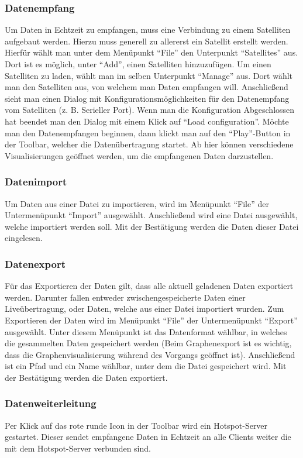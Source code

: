 \subsubsection{Datenempfang}
Um Daten in Echtzeit zu empfangen, muss eine Verbindung zu einem Satelliten aufgebaut werden. Hierzu muss generell zu allererst ein Satellit erstellt werden. Hierfür wählt man unter dem Menüpunkt ``File'' den Unterpunkt ``Satellites'' aus. Dort ist es möglich, unter ``Add'', einen Satelliten hinzuzufügen. Um einen Satelliten zu laden, wählt man im selben Unterpunkt ``Manage'' aus. Dort wählt man den Satelliten aus, von welchem man Daten empfangen will. Anschließend sieht man einen Dialog mit Konfigurationsmöglichkeiten für den Datenempfang vom Satelliten (z. B. Serieller Port). Wenn man die Konfiguration Abgeschlossen hat beendet man den Dialog mit einem Klick auf ``Load configuration''. 
Möchte man den Datenempfangen beginnen, dann klickt man auf den ``Play''-Button in der Toolbar, welcher die Datenübertragung startet. Ab hier können verschiedene Visualisierungen geöffnet werden, um die empfangenen Daten darzustellen.
\subsubsection{Datenimport}
Um Daten aus einer Datei zu importieren, wird im Menüpunkt ``File'' der Untermenüpunkt ``Import'' ausgewählt. Anschließend wird eine Datei ausgewählt, welche importiert werden soll. Mit der Bestätigung werden die Daten dieser Datei eingelesen.
\subsubsection{Datenexport}
Für das Exportieren der Daten gilt, dass alle aktuell geladenen Daten exportiert werden. Darunter fallen entweder zwischengespeicherte Daten einer Liveübertragung, oder Daten, welche aus einer Datei importiert wurden.
Zum Exportieren der Daten wird im Menüpunkt ``File'' der Untermenüpunkt ``Export'' ausgewählt. Unter diesem Menüpunkt ist das Datenformat wählbar, in welches die gesammelten Daten gespeichert werden (Beim Graphenexport ist es wichtig, dass die Graphenvisualisierung während des Vorgangs geöffnet ist). Anschließend ist ein Pfad und ein Name wählbar, unter dem die Datei gespeichert wird. Mit der Bestätigung werden die Daten exportiert.
\subsubsection{Datenweiterleitung}
Per Klick auf das rote runde Icon in der Toolbar wird ein Hotspot-Server gestartet. Dieser sendet empfangene Daten in Echtzeit an alle Clients weiter die mit dem Hotspot-Server verbunden sind.
